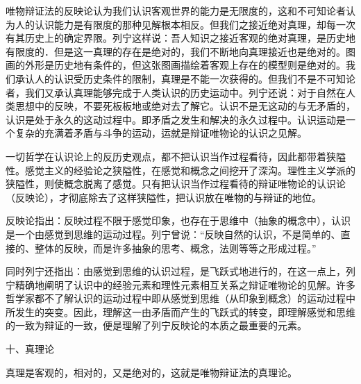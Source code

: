 唯物辩证法的反映论认为我们认识客观世界的能力是无限度的，这和不可知论者认为人的认识能力是有限度的那种见解根本相反。但我们之接近绝对真理，却每一次有其历史上的确定界限。列宁这样说：吾人知识之接近客观的绝对真理，是历史地有限度的．但是这一真理的存在是绝对的，我们不断地向真理接近也是绝对的。图画的外形是历史地有条件的，但这张图画描绘着客观上存在的模型则是绝对的。我们承认人的认识受历史条件的限制，真理是不能一次获得的。但我们不是不可知论者，我们又承认真理能够完成于人类认识的历史运动中。列宁还说：对于自然在人类思想中的反映，不要死板板地或绝对去了解它。认识不是无这动的与无矛盾的，认识是处于永久的这动过程中。即矛盾之发生和解决的永久过程中。认识运动是一个复杂的充满着矛盾与斗争的运动，运就是辩证唯物论的认识之见解。

一切哲学在认识论上的反历史观点，都不把认识当作过程看待，因此都带着狭隘性。感觉主义的经验论之狭隘性，在感觉和概念之间挖开了深沟。理性主义学派的狭隘性，则使概念脱离了感觉。只有把认识当作过程看待的辩证唯物论的认识论（反映论），才彻底除去了这样狭隘性，把认识放在唯物的与辩证的地位。

反映论指出：反映过程不限于感觉印象，也存在于思维中（抽象的概念中），认识是一个由感觉到思维的运动过程。列宁曾说：“反映自然的认识，不是简单的、直接的、整体的反映，而是许多抽象的思考、概念，法则等等之形成过程。”

同时列宁还指出：由感觉到思维的认识过程，是飞跃式地进行的，在这一点上，列宁精确地阐明了认识中的经验元素和理性元素相互关系之辩证唯物论的见解。许多哲学家都不了解认识的运动过程中即从感觉到思维（从印象到概念）的运动过程中所发生的突变。因此，理解这一由矛盾而产生的飞跃式的转变，即理解感觉和思维的一致为辩证的一致，便是理解了列宁反映论的本质之最重要的元素。

十、真理论

真理是客观的，相对的，又是绝对的，这就是唯物辩证法的真理论。

